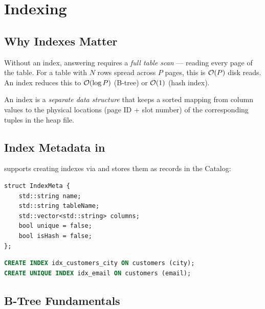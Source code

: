\chapter{Indexing}
\label{ch:indexing}

\section{Why Indexes Matter}

Without an index, answering  requires a \emph{full table scan} --- reading every page of the table.  For a table with $N$ rows spread across $P$ pages, this is $\mathcal{O}(P)$ disk reads.  An index reduces this to $\mathcal{O}(\log P)$ (B-tree) or $\mathcal{O}(1)$ (hash index).

\begin{conceptbox}[Index = Sorted Side Structure]
An index is a \emph{separate data structure} that keeps a sorted mapping from column values to the physical locations (page ID + slot number) of the corresponding tuples in the heap file.
\end{conceptbox}

\section{Index Metadata in \shiftdb{}}

\shiftdb{} supports creating indexes via  and stores them as  records in the Catalog:

\begin{lstlisting}[style=cpp, caption={Index metadata structure.}]
struct IndexMeta {
    std::string name;
    std::string tableName;
    std::vector<std::string> columns;
    bool unique = false;
    bool isHash = false;
};
\end{lstlisting}

\begin{lstlisting}[language=SQL, caption={Creating an index.}]
CREATE INDEX idx_customers_city ON customers (city);
CREATE UNIQUE INDEX idx_email ON customers (email);
\end{lstlisting}

\section{B-Tree Fundamentals}
\label{sec:btree}

